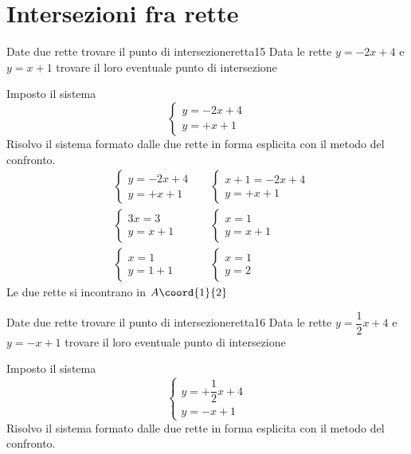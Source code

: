 \section{Intersezioni fra rette}
\begin{esempiot}{Date due rette trovare il punto di intersezione}{retta15}
	Data le rette $y=-2x+4$ e $y=x+1$ trovare il loro eventuale punto di intersezione
\end{esempiot}
Imposto il sistema 
\[\begin{cases} 
	y=-2x+4\\
	y=+x+1
\end{cases}\]
Risolvo il sistema formato dalle due rette in forma esplicita con il metodo del confronto.
\begin{align*}
	&\begin{cases} 
		y=-2x+4\\
		y=+x+1
	\end{cases}&&\begin{cases} 
	x+1=-2x+4\\
	y=+x+1
\end{cases}\\
&\begin{cases} 
	3x=3\\
	y=x+1
\end{cases}&&\begin{cases} 
x=1\\
y=x+1
\end{cases}\\
&\begin{cases} 
	x=1\\
	y=1+1
\end{cases}&&
\begin{cases} 
	x=1\\
	y=2
\end{cases}
\end{align*}
Le due rette si incontrano in $A\coord{1}{2}$
\begin{esempiot}{Date due rette trovare il punto di intersezione}{retta16}
	Data le rette $y=\dfrac{1}{2}x+4$ e $y=-x+1$ trovare il loro eventuale punto di intersezione
\end{esempiot}
Imposto il sistema 
\[\begin{cases} 
y=+\dfrac{1}{2}x+4\\
y=-x+1
\end{cases}\]
Risolvo il sistema formato dalle due rette in forma esplicita con il metodo del confronto.
